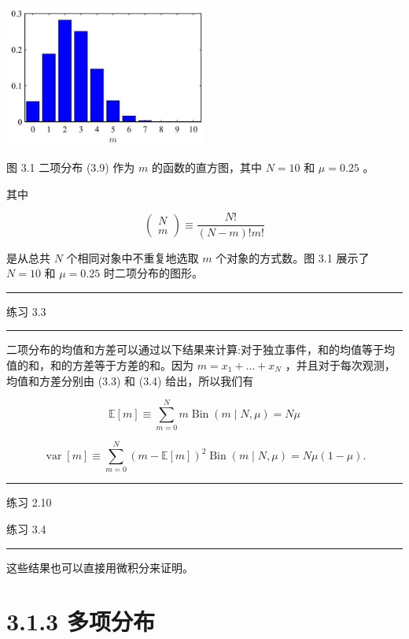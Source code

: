 \documentclass[10pt]{report}
\newcommand{\HRule}{\begin{center}\rule{0.9\linewidth}{0.2mm}\end{center}}
\begin{document}
\begin{center}
\includegraphics[max width=0.5\textwidth]{images/0194e279-9b28-703a-88f4-c3ac21e2010d_87_901_361_636_446_0.jpg}
\end{center}
\hspace*{3em} 

图 3.1 二项分布 (3.9) 作为 \(m\) 的函数的直方图，其中 \(N = {10}\) 和 \(\mu  = {0.25}\) 。

其中

\[
\left( \begin{array}{l} N \\  m \end{array}\right)  \equiv  \frac{N!}{\left( {N - m}\right) !m!} \tag{3.10}
\]

是从总共 \(N\) 个相同对象中不重复地选取 \(m\) 个对象的方式数。图 3.1 展示了 \(N = {10}\) 和 \(\mu  = {0.25}\) 时二项分布的图形。

\HRule

练习 3.3

\HRule

二项分布的均值和方差可以通过以下结果来计算:对于独立事件，和的均值等于均值的和，和的方差等于方差的和。因为 \(m = {x}_{1} + \ldots  + {x}_{N}\) ，并且对于每次观测，均值和方差分别由 (3.3) 和 (3.4) 给出，所以我们有

\[
\mathbb{E}\left\lbrack  m\right\rbrack   \equiv  \mathop{\sum }\limits_{{m = 0}}^{N}m\operatorname{Bin}\left( {m \mid  N,\mu }\right)  = {N\mu } \tag{3.11}
\]

\[
\operatorname{var}\left\lbrack  m\right\rbrack   \equiv  \mathop{\sum }\limits_{{m = 0}}^{N}{\left( m - \mathbb{E}\left\lbrack  m\right\rbrack  \right) }^{2}\operatorname{Bin}\left( {m \mid  N,\mu }\right)  = {N\mu }\left( {1 - \mu }\right) . \tag{3.12}
\]

\HRule

练习 2.10

练习 3.4

\HRule

这些结果也可以直接用微积分来证明。

\section*{3.1.3 多项分布}
\end{document}
